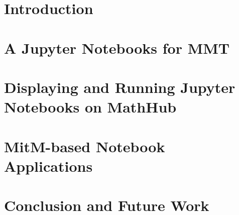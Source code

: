 \documentclass{deliverablereport}
\author{Kai Amann, Michael Kohlhase, Florian Rabe, Tom Wiesing}
\begin{document}
\maketitle
\begin{abstract}\strut\\\end{abstract}
\setcounter{tocdepth}{2}
\tableofcontents
\clearpage

\section{Introduction}\label{sec:intro}


\section[MMT Notebooks]{A Jupyter Notebooks for MMT}\label{sec:mmt-jp}


\section[Notebooks on MathHub]{Displaying and Running Jupyter Notebooks on MathHub}\label{sec:nb-mh}


\section{MitM-based Notebook Applications}\label{sec:mitm-nb}


\section{Conclusion and Future Work}\label{sec:concl}


\printbibliography
\end{document}
